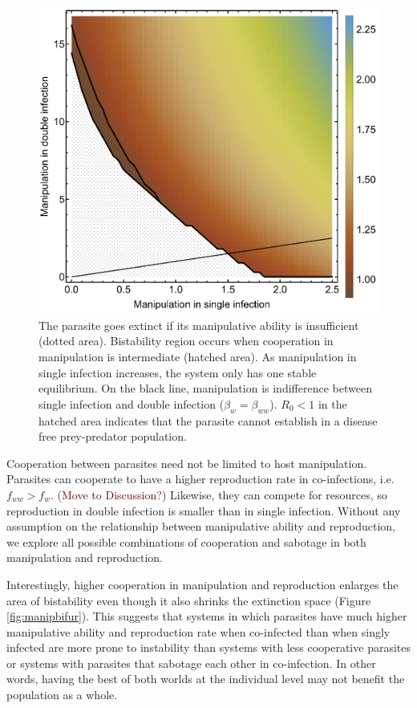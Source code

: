 \documentclass[11pt]{article}
\newcommand{\cha}[1]{\textcolor{darkred}{(#1)}}
\begin{document}
\begin{figure}
\centering
\includegraphics[width=\textwidth]{Figures/manip_bifur_R0.pdf}
\caption{The parasite goes extinct if its manipulative ability is insufficient (dotted area). Bistability region occurs when cooperation in manipulation is intermediate (hatched area). As manipulation in single infection increases, the system only has one stable equilibrium. On the black line, manipulation is indifference between single infection and double infection ($\beta_w = \beta_{ww}$). $R_0 < 1$ in the hatched area indicates that the parasite cannot establish in a disease free prey-predator population.}
\label{fig:manipR0}
\end{figure}

Cooperation between parasites need not be limited to host manipulation. Parasites can cooperate to have a higher reproduction rate in co-infections, i.e. $f_{ww} > f_w$. 
\cha{Move to Discussion?} Likewise, they can compete for resources, so reproduction in double infection is smaller than in single infection. 
Without any assumption on the relationship between manipulative ability and reproduction, we explore all possible combinations of cooperation and sabotage in both manipulation and reproduction. 

Interestingly, higher cooperation in manipulation and reproduction enlarges the area of bistability even though it also shrinks the extinction space (Figure \ref{fig:manipbifur}). 
This suggests that systems in which parasites have much higher manipulative ability and reproduction rate when co-infected than when singly infected are more prone to instability than systems with less cooperative parasites or systems with parasites that sabotage each other in co-infection. 
In other words, having the best of both worlds at the individual level may not benefit the population as a whole.
\end{document}
